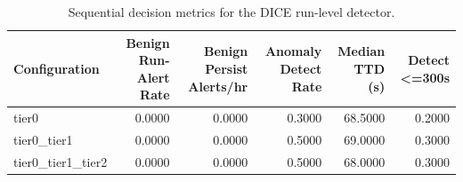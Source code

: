 \begin{table}[t]
\centering
\caption{Sequential decision metrics for the DICE run-level detector.}
\label{tab:dice_sequential_metrics}
\footnotesize
\begin{tabular}{lrrrrr}
\toprule
Configuration & Benign Run-Alert Rate & Benign Persist Alerts/hr & Anomaly Detect Rate & Median TTD (s) & Detect <=300s \\
\midrule
tier0 & 0.0000 & 0.0000 & 0.3000 & 68.5000 & 0.2000 \\
tier0_tier1 & 0.0000 & 0.0000 & 0.5000 & 69.0000 & 0.3000 \\
tier0_tier1_tier2 & 0.0000 & 0.0000 & 0.5000 & 68.0000 & 0.3000 \\
\bottomrule
\end{tabular}

\end{table}
